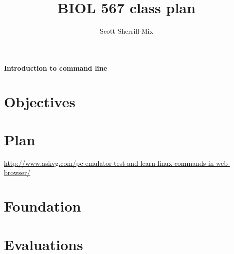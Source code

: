 \documentclass[12pt]{article}
\title{BIOL 567 class plan}
\date{}
\author{Scott Sherrill-Mix}
\begin{document}
\thispagestyle{plain}
\begin{center}
	\Large{\textbf{Introduction to command line}}
\end{center}

\section{Objectives}


\section{Plan}
\url{http://www.askvg.com/pc-emulator-test-and-learn-linux-commands-in-web-browser/}

\section{Foundation}

\section{Evaluations}
\end{document}
